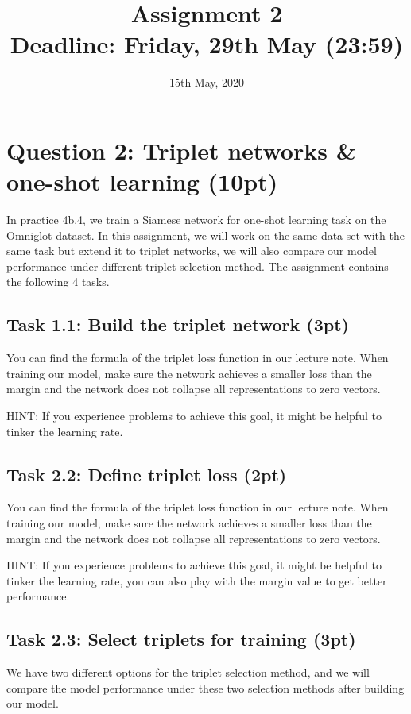\documentclass[a4paper,twoside,10pt]{article}
\title{\vspace{-\baselineskip}\sffamily\bfseries Assignment 2 \\
\large Deadline: Friday, 29th May (23:59)}
\date{15th May, 2020}
\begin{document}
\maketitle

\section*{Question 2: Triplet networks \& one-shot learning (10pt)}
In practice 4b.4, we train a Siamese network for one-shot learning task on the Omniglot dataset.  In this assignment, we will work on the same data set with the same task but extend it to triplet networks, we will also compare our model performance under different triplet selection method. The assignment contains the following 4 tasks.




\subsection*{Task 1.1:  Build  the triplet network (3pt)}
You can find the formula of the triplet loss function in our lecture note. When training our model, make sure the network achieves a smaller loss than the margin and the network does not collapse all representations to zero vectors. 

HINT: If you experience problems to achieve this goal, it might be helpful to tinker the learning rate.



\subsection*{Task 2.2: Define triplet loss (2pt)}
You can find the formula of the triplet loss function in our lecture note. When training our model, make sure the network achieves a smaller loss than the margin and the network does not collapse all representations to zero vectors. 

HINT: If you experience problems to achieve this goal, it might be helpful to tinker the learning rate, you can also play with the margin value to get better performance.


\subsection*{Task 2.3: Select triplets for training (3pt)}
We have two different options for the triplet selection method, and we will compare the model performance under these two selection methods after building our model.
\end{document}

